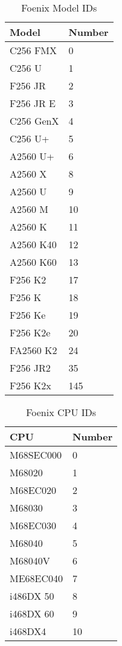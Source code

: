 \begin{table}
	\begin{center}
		\begin{tabular}{|l|l|} \hline
			Model & Number \\ \hline\hline
			C256 FMX & 0 \\ \hline
			C256 U & 1 \\ \hline
			F256 JR & 2 \\ \hline
			F256 JR E & 3 \\ \hline
			C256 GenX & 4 \\ \hline
			C256 U+ & 5 \\ \hline
			A2560 U+ & 6 \\ \hline
			A2560 X & 8 \\ \hline
			A2560 U & 9 \\ \hline
			A2560 M & 10 \\ \hline
			A2560 K & 11 \\ \hline
			A2560 K40 & 12 \\ \hline
			A2560 K60 & 13 \\ \hline
			F256 K2 & 17 \\ \hline
			F256 K & 18 \\ \hline
			F256 Ke & 19 \\ \hline
			F256 K2e & 20 \\ \hline
			FA2560 K2 & 24 \\ \hline
			F256 JR2 & 35 \\ \hline
			F256 K2x & 145 \\ \hline
		\end{tabular}
	\end{center}
	\caption{Foenix Model IDs}
	\label{tbl:fnx_model_ids}
\end{table}

\begin{table}
	\begin{center}
		\begin{tabular}{|l|l|} \hline
			CPU & Number \\ \hline\hline
			M68SEC000 & 0 \\ \hline
			M68020 & 1 \\ \hline
			M68EC020 & 2 \\ \hline
			M68030 & 3 \\ \hline
			M68EC030 & 4 \\ \hline
			M68040 & 5 \\ \hline
			M68040V & 6 \\ \hline
			ME68EC040 & 7 \\ \hline
			i486DX 50 & 8 \\ \hline
			i468DX 60 & 9 \\ \hline
			i468DX4 & 10 \\ \hline
		\end{tabular}
	\end{center}
	\caption{Foenix CPU IDs}
	\label{tbl:fnx_cpu_ids}
\end{table}

